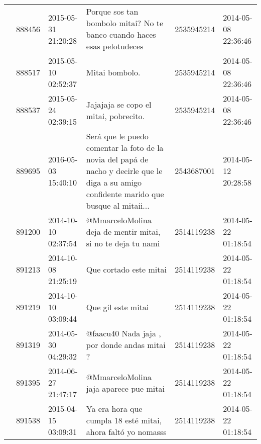 \begin{tabular}{llllrl}
           & 888456  & 2015-05-31 21:20:28 &                                                                      Porque sos tan bombolo mitai? No te banco cuando haces esas pelotudeces &  2535945214 & 2014-05-08 22:36:46 \\
           & 888517  & 2015-05-10 02:52:37 &                                                                                                                               Mitai bombolo. &  2535945214 & 2014-05-08 22:36:46 \\
           & 888537  & 2015-05-24 02:39:15 &                                                                                                        Jajajaja se copo el mitai, pobrecito. &  2535945214 & 2014-05-08 22:36:46 \\
           & 889695  & 2016-05-03 15:40:10 &  Será que le puedo comentar la foto de la novia del papá de nacho y decirle que le diga a su amigo confidente marido que busque al mitaii... &  2543687001 & 2014-05-12 20:28:58 \\
           & 891200  & 2014-10-10 02:37:54 &                                                                                  @MmarceloMolina deja de mentir mitai, si no te deja tu nami &  2514119238 & 2014-05-22 01:18:54 \\
           & 891213  & 2014-10-08 21:25:19 &                                                                                                                       Que cortado este mitai &  2514119238 & 2014-05-22 01:18:54 \\
           & 891219  & 2014-10-10 03:09:44 &                                                                                                                           Que gil este mitai &  2514119238 & 2014-05-22 01:18:54 \\
           & 891319  & 2014-05-30 04:29:32 &                                                                                                 @faacu40 Nada jaja , por donde andas mitai ? &  2514119238 & 2014-05-22 01:18:54 \\
           & 891395  & 2014-06-27 21:47:17 &                                                                                                       @MmarceloMolina jaja aparece pue mitai &  2514119238 & 2014-05-22 01:18:54 \\
           & 891538  & 2015-04-15 03:09:31 &                                                                                 Ya era hora que cumpla 18 esté mitai, ahora faltó yo nomasss &  2514119238 & 2014-05-22 01:18:54 \\

\end{tabular}
